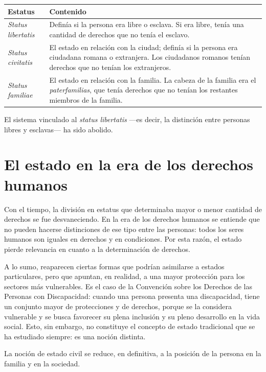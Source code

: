 \documentclass[12pt,oneside]{book}
\begin{document}
\begin{table}[H]
\centering
\begin{tabularx}{\textwidth}{l X}
\toprule
\textbf{Estatus} & \textbf{Contenido} \\
\midrule
\textit{Status libertatis} & Definía si la persona era libre o esclava. Si era libre, tenía una cantidad de derechos que no tenía el esclavo. \\
\textit{Status civitatis} & El estado en relación con la ciudad; definía si la persona era ciudadana romana o extranjera. Los ciudadanos romanos tenían derechos que no tenían los extranjeros. \\
\textit{Status familiae} & El estado en relación con la familia. La cabeza de la familia era el \textit{paterfamilias}, que tenía derechos que no tenían los restantes miembros de la familia. \\
\bottomrule
\end{tabularx}
\end{table}

El sistema vinculado al \textit{status libertatis} —es decir, la distinción entre personas libres y esclavas— ha sido abolido.

\section{El estado en la era de los derechos humanos}

Con el tiempo, la división en estatus que determinaba mayor o menor cantidad de derechos se fue desvaneciendo. En la era de los derechos humanos se entiende que no pueden hacerse distinciones de ese tipo entre las personas: todos los seres humanos son iguales en derechos y en condiciones. Por esta razón, el estado pierde relevancia en cuanto a la determinación de derechos.

\begin{important}
A lo sumo, reaparecen ciertas formas que podrían asimilarse a estados particulares, pero que apuntan, en realidad, a una mayor protección para los sectores más vulnerables. Es el caso de la Convención sobre los Derechos de las Personas con Discapacidad: cuando una persona presenta una discapacidad, tiene un conjunto mayor de protecciones y de derechos, porque se la considera vulnerable y se busca favorecer su plena inclusión y su pleno desarrollo en la vida social. Esto, sin embargo, no constituye el concepto de estado tradicional que se ha estudiado siempre: es una noción distinta.

La noción de estado civil se reduce, en definitiva, a la posición de la persona en la familia y en la sociedad.
\end{important}
\end{document}
